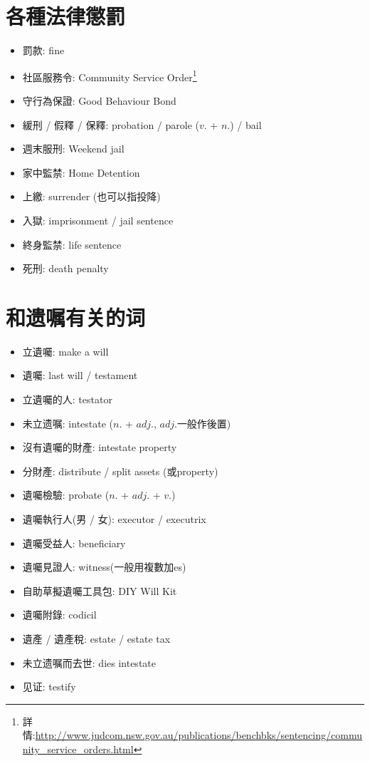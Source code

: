 \section{各種法律懲罰}
\begin{multicols}{2}
\begin{itemize}
  \itemsep0em
  \item 罰款: fine
  \item 社區服務令: Community Service Order\footnote{詳情:\url{http://www.judcom.nsw.gov.au/publications/benchbks/sentencing/community_service_orders.html}}
  \item 守行為保證: Good Behaviour Bond
  \item 緩刑 / 假釋 / 保釋: probation / parole ($v.$ + $n.$) / bail
  \item 週末服刑: Weekend jail
  \item 家中監禁: Home Detention
  \item 上繳: surrender (也可以指投降)
  \item 入獄: imprisonment / jail sentence
  \item 終身監禁: life sentence
  \item 死刑: death penalty
\end{itemize}
\end{multicols}

\section{和遗嘱有关的词}
\begin{multicols}{2}
\begin{itemize}
  \itemsep0em
  \item 立遺囑: make a will
  \item 遺囑: last will / testament
  \item 立遺囑的人: testator
  \item 未立遗嘱: intestate ($n.$ + $adj.$, $adj.$一般作後置)
  \item 沒有遺囑的財產: intestate property
  \item 分財產: distribute / split assets (或property)
  \item 遺囑檢驗: probate ($n.$ + $adj.$ + $v.$)
  \item 遺囑執行人(男 / 女): executor / executrix
  \item 遺囑受益人: beneficiary
  \item 遺囑見證人: witness(一般用複數加es)
  \item 自助草擬遺囑工具包: DIY Will Kit
  \item 遺囑附錄: codicil
  \item 遺產 / 遺產稅: estate / estate tax
  \item 未立遗嘱而去世: dies intestate
  \item 见证: testify
\end{itemize}
\end{multicols}

